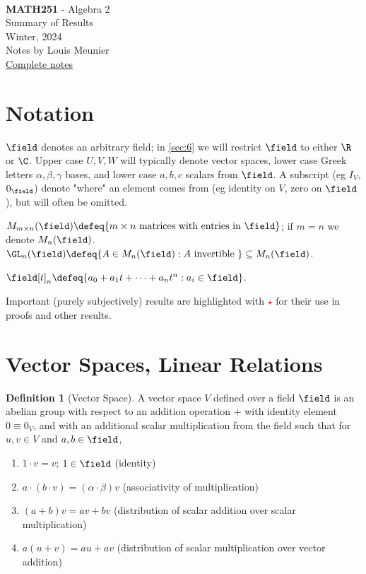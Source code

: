 \documentclass[12pt, oneside]{article}
\newcommand{\pageauthor}{Louis Meunier}
\newcommand{\pagetitle}{Algebra 2}
\newcommand{\pagesubtitle}{MATH251}
\newcommand{\pagedescription}{Summary of Results}
\newcommand{\pagesemester}{Winter, 2024 }
\newcommand{\thetitle}{
  \noindent
  \vspace*{5em}\\
  {\Large\textbf{\pagesubtitle} - \pagetitle}\\
  {\small{\pagedescription}}
  \vspace*{2em}\\
  {\small \pagesemester\\
  Notes by \pageauthor}\\
  {\small \href{https://notes.louismeunier.net/Algebra 2/algebra2.pdf}{Complete notes}}
}
\theoremstyle{definition}
\newtheorem{defn}{Definition}
\theoremstyle{plain}
\theoremstyle{remark}
\let\origsection=\section
\renewcommand\section[1]{\origsection{#1}\label{sec:\thesection}}
\begin{document}
\thetitle
\tableofcontents
{}

\section{Notation}

$\field$ denotes an arbitrary field; in \cref{sec:6} we will restrict $\field$ to either $\R$ or $\C$. Upper case $U, V, W$ will typically denote vector spaces, lower case Greek letters $\alpha, \beta, \gamma$ bases, and lower case $a, b, c$ scalars from $\field$. A subscript (eg $I_V$, $0_\field$) denote "where" an element comes from (eg identity on $V$, zero on $\field$), but will often be omitted.

$M_{m \times n}(\field) \defeq \{m \times n \text{ matrices with entries in }\field \}$; if $m = n$ we denote $M_n(\field)$. $\GL_n(\field) \defeq \{A \in M_n(\field) : A \text{ invertible }\} \subseteq M_n(\field)$.

$\field[t]_n \defeq \{a_0 + a_1 t + \cdots + a_n t^n : a_i \in \field\}$.

Important (purely subjectively) results are highlighted with \textcolor{red}{$\star$} for their use in proofs and other results.

\section{Vector Spaces, Linear Relations}


\begin{defn}[Vector Space]
  A vector space $V$ defined over a field $\field$ is an abelian group with respect to an addition operation $+$ with identity element $0 \equiv 0_V$, and with an additional scalar multiplication from the field such that for $u, v \in V$ and $a, b\in \field$, \begin{enumerate}
    \item $1 \cdot v = v$; $1 \in \field$ (identity)
    \item $a \cdot (b \cdot v) = (\alpha \cdot \beta)v$ (associativity of multiplication)
    \item $(a+b)v = a v + b v$ (distribution of scalar addition over scalar multiplication)
    \item $a (u + v) = a u + av$ (distribution of scalar multiplication over vector addition)
  \end{enumerate}
\end{defn}
\end{document}

